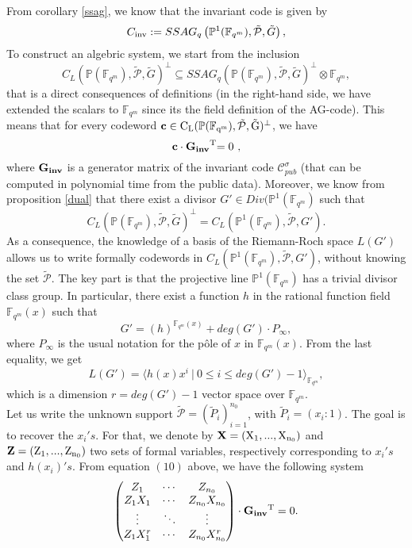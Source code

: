 \documentclass[10pt]{article}
\newcommand{\cd}{\cdot}
\newcommand{\fqm}{\mathbb{F}_{q^m}}
\newcommand{\su}{\subseteq}
\newcommand{\PR}{\mathcal{P}}
\begin{document}
From corollary \ref{ssag}, we know that the invariant code is given by 
\[C_{\rm{inv}} := SSAG_q\left(\mathbb{P}^1(\fqm),\tilde{\PR},\tilde{G}\right),\]
To construct an algebric system, we start from the inclusion 
\[C_L(\mathbb{P}(\fqm),\tilde{\PR},\tilde{G})^{\perp} \su SSAG_q(\mathbb{P}(\fqm),\tilde{\PR},\tilde{G})^{\perp} \otimes \fqm,\]
that is a direct consequences of definitions (in the right-hand side, we have extended the scalars to $\fqm$ since its the field definition of the AG-code). This means that for every codeword $\bf{c} \rm \in C_L(\mathbb{P}(\fqm),\tilde{\PR},\tilde{G})^{\perp}$, we have 
\begin{equation}
\bf{c \cd G_{inv}}^{\rm{T}}  \rm {= 0}\ ,
\end{equation}
where $\bf{G_{inv}}$ is a generator matrix of the invariant code $\mathcal{C}_{pub}^{\sigma}$ (that can be computed in polynomial time from the public data). Moreover, we know from proposition \ref{dual} that there exist a divisor $G' \in Div(\mathbb{P}^1(\fqm)$ such that
\[ C_L(\mathbb{P}(\fqm),\tilde{\PR},\tilde{G})^{\perp} = C_L(\mathbb{P}^1(\fqm),\tilde{\PR},G').\]
As a consequence, the knowledge of a basis of the Riemann-Roch space $L(G')$ allows us to write formally codewords in $C_L(\mathbb{P}^1(\fqm),\tilde{\PR},G')$, without knowing the set $\tilde{\PR}$. The key part is that the projective line $\mathbb{P}^1(\fqm)$ has a trivial divisor class group. In particular, there exist a function $h$ in the rational function field $\fqm(x)$ such that
\[ G' = (h)^{\fqm(x)} + deg(G') \cd P_{\infty},\]
where $P_{\infty}$ is the usual notation for the pôle of $x$ in $\fqm(x)$. From the last equality, we get
\[L(G') = \langle h(x)x^i \ | \ 0 \leq i \leq deg(G')-1\rangle_{\fqm},\]
which is a dimension $r=deg(G')-1$ vector space over $\fqm$. \\
Let us write the unknown support $\tilde{\PR} = (\tilde{P}_i)_{i=1}^{n_0}$, with $\tilde{P}_i=(x_i:1)$. The goal is to recover the $x_i's$. For that, we denote by  
$\bf{X} \rm = (X_1,...,X_{n_0})$ and $\bf{Z} \rm = (Z_1,...,Z_{n_0})$ two sets of formal variables, respectively corresponding to $x_i's$ and $h(x_i)'s$. From equation $(10)$ above, we have the following system
\begin{equation*}
\begin{pmatrix}
Z_1 & \cdots & Z_{n_0} \\
Z_1X_1 & \cdots & Z_{n_0}X_{n_0} \\
\vdots & \ddots & \vdots \\
Z_1X_1^r & \cdots & Z_{n_0}X_{n_0}^r 
\end{pmatrix}
\cd \bf{G_{inv}} \rm{^T} = 0.
\end{equation*}
\end{document}

